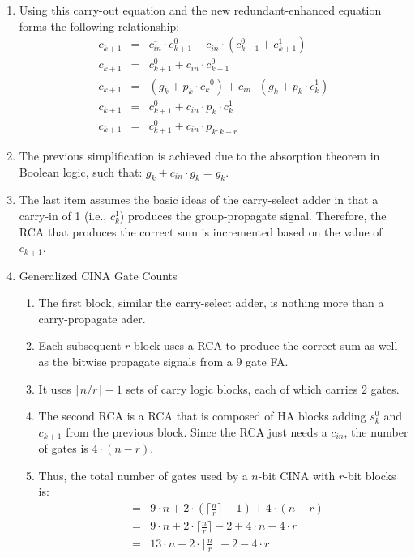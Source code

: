 \documentclass[times, twocolumn, 10pt]{article}
\begin{document}
\begin{enumerate}
\begin{enumerate}
\item Using this carry-out equation and the new redundant-enhanced equation
  forms the following relationship:
\begin{eqnarray*}
c_{k+1} & = & \overline{c_{in}} \cdot c_{k+1}^0 + c_{in} \cdot (c_{k+1}^0 +
    c_{k+1}^1) \\
c_{k+1} & = & c_{k+1}^0 + c_{in} \cdot c_{k+1}^0 \\
c_{k+1} & = & (g_k + p_k \cdot {c_k}^0) + c_{in} \cdot (g_k + p_k \cdot c_k^1)
    \\
c_{k+1} & = & c_{k+1}^0 + c_{in} \cdot p_k \cdot c_k^1 \\
c_{k+1} & = & c_{k+1}^0 + c_{in} \cdot p_{k:k-r}
\end{eqnarray*}
\item The previous simplification is achieved due to the absorption theorem in Boolean logic, such that:  $g_k + c_{in} \cdot g_k = g_k$.
\item The last item assumes the basic ideas of the carry-select adder in that
  a carry-in of 1 (i.e., $c_k^1$) produces the group-propagate signal.
  Therefore, the RCA that produces the correct sum is incremented based on
  the value of $c_{k+1}$.
\item Generalized CINA Gate Counts
\begin{enumerate}
\item The first block, similar the carry-select adder, is nothing more than a
  carry-propagate ader.
\item Each subsequent $r$ block uses a RCA to produce the correct sum as well
  as the bitwise propagate signals from a $9$ gate FA.
\item It uses $\lceil n/r \rceil - 1$ sets of carry logic blocks, each of
  which carries $2$ gates.
\item The second RCA is a RCA that is composed of HA blocks adding $s_k^0$
  and $c_{k+1}$ from the previous block.  Since the RCA just needs a $c_{in}$,
  the number of gates is $4 \cdot (n - r)$.
\item Thus, the total number of gates used by a $n$-bit CINA with $r$-bit
  blocks is:
\begin{eqnarray*}
  & = & 9 \cdot n + 2 \cdot \left( \lceil \frac{n}{r} \rceil -1
  \right) + 4 \cdot (n - r) \\
  & = & 9 \cdot n + 2 \cdot \lceil \frac{n}{r} \rceil - 2 + 4 \cdot n
  - 4 \cdot r \\
  & = & 13 \cdot n + 2 \cdot \lceil \frac{n}{r} \rceil - 2 - 4 \cdot r
\end{eqnarray*}

\end{enumerate}
\end{enumerate}
\end{enumerate}
\end{document}
